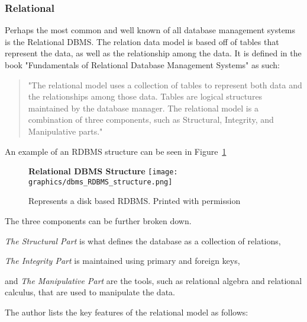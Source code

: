 \documentclass[letterpaper, 11pt]{article}
\begin{document}
\subsubsection{Relational}
Perhaps the most common and well known of all database management systems is the
Relational DBMS. The relation data model is based off of tables that represent
the data, as well as the relationship among the data. It is defined in the book
"Fundamentals of Relational Database Management Systems" as such:
\begin{quote}
"The relational model uses a collection of tables to represent both data and
the relationships among those data. Tables are logical structures maintained
by the database manager. The relational model is a combination of three
components, such as Structural, Integrity, and Manipulative parts."
\cite{sumathi2007fundamentals}
\end{quote}
\par\vspace{\baselineskip}
An example of an RDBMS structure can be seen in Figure~\ref{fig:RDBMS_structure}
\begin{figure}
  \centering
  \label{fig:RDBMS_structure}
  \textbf{Relational DBMS Structure}
  \texttt{[image: graphics/dbms\_RDBMS\_structure.png]}
  \caption{Represents a disk based RDBMS. Printed with permission \cite{wikiRDBMS}}
\end{figure}
The three components can be further broken down.
\par\vspace{\baselineskip}
\textit{The Structural Part} is what defines the database as a collection of relations,
\par\vspace{\baselineskip}
\textit{The Integrity Part} is maintained using primary and foreign keys,
\par\vspace{\baselineskip}and
\textit{The Manipulative Part} are the tools, such as relational algebra and
relational calculus, that are used to manipulate the data.
\par\vspace{\baselineskip}
The author lists the key features of the relational model as follows:
\end{document}
